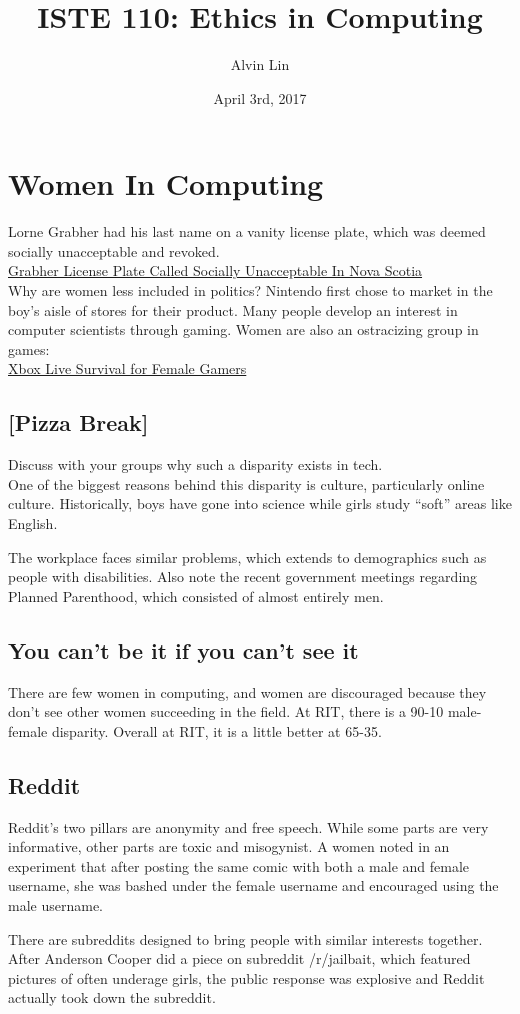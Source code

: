 \documentclass[letterpaper, 12pt]{article}
\title{ISTE 110: Ethics in Computing}
\author{Alvin Lin}
\date{April 3rd, 2017}
\begin{document}
\maketitle

\section*{Women In Computing}
Lorne Grabher had his last name on a vanity license plate, which was deemed
socially unacceptable and revoked. \\
\href{http://dailycaller.com/2017/03/25/grabher-license-plate-called-socially-unacceptable-in-nova-scotia/}{Grabher License Plate Called Socially Unacceptable In Nova Scotia} \\
Why are women less included in politics?
Nintendo first chose to market in the boy's aisle of stores for their product.
Many people develop an interest in computer scientists through gaming.
Women are also an ostracizing group in games: \\
\href{https://www.lifewire.com/xbox-live-survival-for-female-gamers-3562487}
{Xbox Live Survival for Female Gamers} \\

\subsection*{[Pizza Break]}
Discuss with your groups why such a disparity exists in tech. \\
One of the biggest reasons behind this disparity is culture, particularly
online culture. Historically, boys have gone into science while girls study
``soft'' areas like English. \par
The workplace faces similar problems, which extends to demographics such as
people with disabilities. Also note the recent government meetings regarding
Planned Parenthood, which consisted of almost entirely men.

\subsection*{You can't be it if you can't see it}
There are few women in computing, and women are discouraged because they don't
see other women succeeding in the field. At RIT, there is a 90-10 male-female
disparity. Overall at RIT, it is a little better at 65-35.

\subsection*{Reddit}
Reddit's two pillars are anonymity and free speech. While some parts are very
informative, other parts are toxic and misogynist. A women noted in an
experiment that after posting the same comic with both a male and female
username, she was bashed under the female username and encouraged using the
male username. \par
There are subreddits designed to bring people with similar interests together.
After Anderson Cooper did a piece on subreddit /r/jailbait, which featured
pictures of often underage girls, the public response was explosive and Reddit
actually took down the subreddit.
\end{document}
